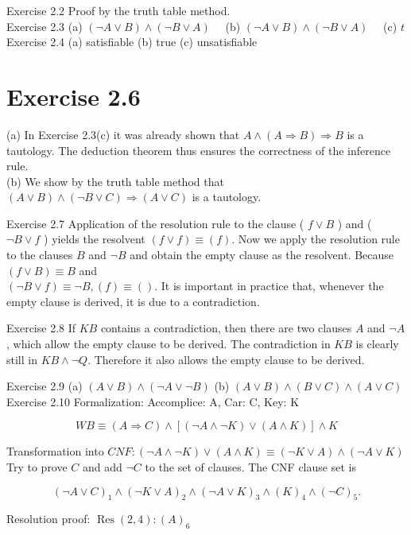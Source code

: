 \documentclass[10pt]{article}
\begin{document}
Exercise 2.2 Proof by the truth table method.\\
Exercise 2.3 (a) $(\neg A \vee B) \wedge(\neg B \vee A) \quad$ (b) $(\neg A \vee B) \wedge(\neg B \vee A) \quad$ (c) $t$\\
Exercise 2.4 (a) satisfiable (b) true (c) unsatisfiable

\section*{Exercise 2.6}
(a) In Exercise 2.3(c) it was already shown that $A \wedge(A \Rightarrow B) \Rightarrow B$ is a tautology. The deduction theorem thus ensures the correctness of the inference rule.\\
(b) We show by the truth table method that $(A \vee B) \wedge(\neg B \vee C) \Rightarrow(A \vee C)$ is a tautology.

Exercise 2.7 Application of the resolution rule to the clause ( $f \vee B$ ) and ( $\neg B \vee f$ ) yields the resolvent $(f \vee f) \equiv(f)$. Now we apply the resolution rule to the clauses $B$ and $\neg B$ and obtain the empty clause as the resolvent. Because $(f \vee B) \equiv B$ and\\
$(\neg B \vee f) \equiv \neg B,(f) \equiv()$. It is important in practice that, whenever the empty clause is derived, it is due to a contradiction.


Exercise 2.8 If $K B$ contains a contradiction, then there are two clauses $A$ and $\neg A$, which allow the empty clause to be derived. The contradiction in $K B$ is clearly still in $K B \wedge \neg Q$. Therefore it also allows the empty clause to be derived.

Exercise 2.9 (a) $(A \vee B) \wedge(\neg A \vee \neg B)$ (b) $(A \vee B) \wedge(B \vee C) \wedge(A \vee C)$\\
Exercise 2.10 Formalization: Accomplice: A, Car: C, Key: K

$$
W B \equiv(A \Rightarrow C) \wedge[(\neg A \wedge \neg K) \vee(A \wedge K)] \wedge K
$$

Transformation into $C N F:(\neg A \wedge \neg K) \vee(A \wedge K) \equiv(\neg K \vee A) \wedge(\neg A \vee K)$\\
Try to prove $C$ and add $\neg C$ to the set of clauses. The CNF clause set is

$$
(\neg A \vee C)_{1} \wedge(\neg K \vee A)_{2} \wedge(\neg A \vee K)_{3} \wedge(K)_{4} \wedge(\neg C)_{5} .
$$

Resolution proof: $\operatorname{Res}(2,4):(A)_{6}$
\end{document}
